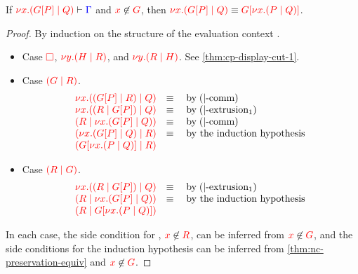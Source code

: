 \begin{lemmaB}\label{thm:nc-display-cut-1}
  If $\seq[{ \tm{\cpCut{x}{\cpPlug{G}{P}}{Q}} }]{ \Gamma }$ and
  $\notFreeIn{x}{G}$, then $\tm{\cpCut{x}{\cpPlug{G}{P}}{Q}} \equiv
  \tm{\cpPlug{G}{\cpCut{x}{P}{Q}}}$.
\end{lemmaB}
\begin{proof}
  By induction on the structure of the evaluation context .
  \begin{itemize}
  \item
    Case $\tm{\Box}$, $\tm{\cpCut{y}{H}{R}}$, and $\tm{\cpCut{y}{R}{H}}$. See \cref{thm:cp-display-cut-1}.
  \item
    Case $\tm{\ncPool{G}{R}}$.
    \[\!
      \begin{array}{ll}
        \tm{\cpCut{x}{\ncPool{\cpPlug{G}{P}}{R}}{Q}} & \equiv \quad \text{by} \; \ncEquivPoolComm \\
        \tm{\cpCut{x}{\ncPool{R}{\cpPlug{G}{P}}}{Q}} & \equiv \quad \text{by} \; \ncRedKappaPool1 \\
        \tm{\ncPool{R}{\cpCut{x}{\cpPlug{G}{P}}{Q}}} & \equiv \quad \text{by} \; \ncEquivPoolComm \\
        \tm{\ncPool{\cpCut{x}{\cpPlug{G}{P}}{Q}}{R}} & \equiv \quad \text{by the induction hypothesis}\\
        \tm{\ncPool{\cpPlug{G}{\cpCut{x}{P}{Q}}}{R}} &
      \end{array}
    \]
  \item
    Case $\tm{\ncPool{R}{G}}$.
    \[\!
      \begin{array}{ll}
        \tm{\cpCut{x}{\ncPool{R}{\cpPlug{G}{P}}}{Q}} & \equiv \quad \text{by} \; \ncRedKappaPool1 \\
        \tm{\ncPool{R}{\cpCut{x}{\cpPlug{G}{P}}{Q}}} & \equiv \quad \text{by the induction hypothesis}\\
        \tm{\ncPool{R}{\cpPlug{G}{\cpCut{x}{P}{Q}}}} &
      \end{array}
    \]
  \end{itemize}
  In each case, the side condition for , $\notFreeIn{x}{R}$, can
  be inferred from $\notFreeIn{x}{G}$, and the side conditions for the induction
  hypothesis can be inferred from \cref{thm:nc-preservation-equiv} and
  $\notFreeIn{x}{G}$.
\end{proof}
